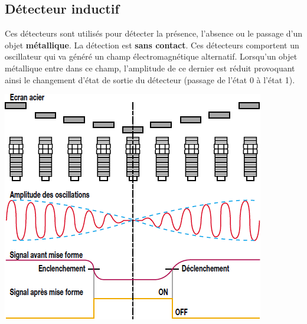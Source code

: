 \documentclass[10pt]{article}
\begin{document}
\subsection{Détecteur inductif}

\begin{minipage}[c]{.5\linewidth}
Ces détecteurs sont utilisés pour détecter la présence, l'absence ou le passage d'un objet \textbf{métallique}. La détection est \textbf{sans contact}. Ces détecteurs comportent un oscillateur qui va généré un champ électromagnétique alternatif. Lorsqu'un objet métallique entre dans ce champ, l'amplitude de ce dernier est réduit provoquant ainsi le changement d'état de sortie du détecteur (passage de l'état 0 à l'état 1).
\end{minipage}\hfill
\begin{minipage}[c]{.45\linewidth}
\begin{center}
 \includegraphics[width=.9\textwidth]{images/deductif_2}
\end{center}
\end{minipage}
\end{document}
